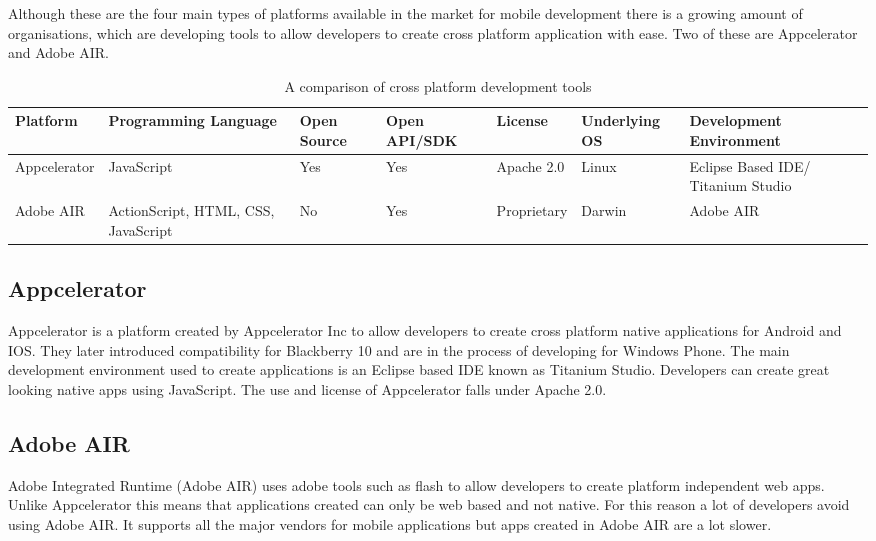 Although these are the four main types of platforms available in the market for mobile development there is a growing amount of organisations, which are developing tools to allow developers to create cross platform application with ease. Two of these are Appcelerator and Adobe AIR.

\begin{table}
    \begin{tabular}{|l|l|l|l|l|l|l|}
    \hline
    Platform     & Programming   Language              & Open Source & Open API/SDK & License     & Underlying OS & Development   Environment          \\ \hline
    Appcelerator & JavaScript                          & Yes         & Yes          & Apache 2.0  & Linux         & Eclipse Based IDE/ Titanium Studio \\ \hline
    Adobe AIR    & ActionScript, HTML, CSS, JavaScript & No          & Yes          & Proprietary & Darwin        & Adobe AIR                          \\ \hline
    \end{tabular}
     \caption {A comparison of cross platform development tools}
\end{table}

\subsection{Appcelerator}

Appcelerator is a platform created by Appcelerator Inc to allow developers to create cross platform native applications for Android and IOS. They later introduced compatibility for Blackberry 10 and are in the process of developing for Windows Phone. The main development environment used to create applications is an Eclipse based IDE known as Titanium Studio. Developers can create great looking native apps using JavaScript. The use and license of Appcelerator falls under Apache 2.0.

\subsection{Adobe AIR}

Adobe Integrated Runtime (Adobe AIR) uses adobe tools such as flash to allow developers to create platform independent web apps. Unlike Appcelerator this means that applications created can only be web based and not native. For this reason a lot of developers avoid using Adobe AIR. It supports all the major vendors for mobile applications but apps created in Adobe AIR are a lot slower.

